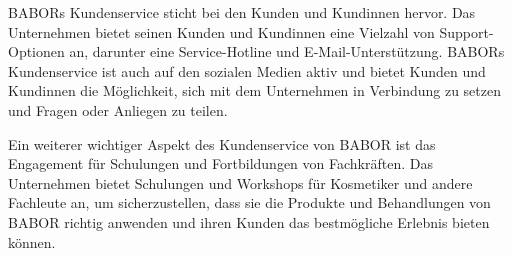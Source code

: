 BABORs Kundenservice sticht bei den Kunden und Kundinnen hervor. Das Unternehmen bietet seinen Kunden und Kundinnen eine Vielzahl von Support-Optionen an, darunter eine Service-Hotline und E-Mail-Unterstützung. BABORs Kundenservice ist auch auf den sozialen Medien aktiv und bietet Kunden und Kundinnen die Möglichkeit, sich mit dem Unternehmen in Verbindung zu setzen und Fragen oder Anliegen zu teilen.
\newline

Ein weiterer wichtiger Aspekt des Kundenservice von BABOR ist das Engagement für Schulungen und Fortbildungen von Fachkräften. Das Unternehmen bietet Schulungen und Workshops für Kosmetiker und andere Fachleute an, um sicherzustellen, dass sie die Produkte und Behandlungen von BABOR richtig anwenden und ihren Kunden das bestmögliche Erlebnis bieten können.
